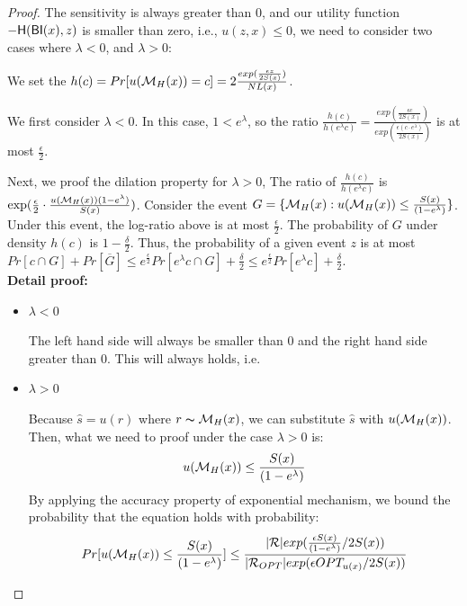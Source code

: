 \begin{proof}

The sensitivity is always greater than 0, and our utility function $-\mathsf{H}(\mathsf{BI}(x),z)$ is smaller than zero, i.e., $u(z,x) \leq 0$, we need to consider two cases where $\lambda < 0$, and $\lambda > 0$:

We set the $h(c) = Pr[u(\mathcal{M}_H(x)) = c] = 2\frac{exp(\frac{\epsilon z}{2 S(x)})}{NL(x)}$.

We first consider $\lambda < 0$. In this case, $1 < e ^ {\lambda}$, so the ratio $\frac{h(c)}{h(e^{\lambda}c)} = \frac{exp(\frac{\epsilon c}{2 S(x)})}{exp(\frac{\epsilon (c \cdot e^{\lambda})}{2 S(x)})}$ is at most $\frac{\epsilon}{2}$.

Next, we proof the dilation property for $\lambda > 0$, The ratio of $\frac{h(c)}{h(e^{\lambda}c)}$ is $\exp(\frac{\epsilon}{2} \cdot \frac{u(\mathcal{M}_H(x)) (1 - e^{\lambda})}{S(x)})$. Consider the event $G = \{ \mathcal{M}_H(x) : u(\mathcal{M}_H(x)) \leq \frac{S(x)}{(1 - e^{\lambda})}\}$. Under this event, the log-ratio above is at most $\frac{\epsilon}{2}$. The probability of $G$ under density $h(c)$ is $1 - \frac{\delta}{2}$. Thus, the probability of a given event $z$ is at most $Pr[c \cap G] + Pr[\overline{G}] \leq e^{\frac{\epsilon}{2}} Pr[e^{\lambda}c \cap G] + \frac{\delta}{2} \leq e^{\frac{\epsilon}{2}} Pr[e^{\lambda}c] + \frac{\delta}{2}$.\\


\textbf{Detail proof:}
\begin{itemize}

	\item $\lambda < 0$

		The left hand side will always be smaller than 0 and the right hand side greater than 0. This will always holds, i.e.
		\begin{equation*}
		\end{equation*}
	\item $\lambda > 0$


Because $\hat{s} = u(r)$ where $r \thicksim \mathcal{M}_H(x)$, we can substitute $\hat{s}$ with $u(\mathcal{M}_H(x))$. Then, what we need to proof under the case $\lambda > 0$ is:
\begin{equation*}
u(\mathcal{M}_H(x)) \leq \frac{S(x)}{(1 - e ^ {\lambda})}
\end{equation*}
By applying the accuracy property of exponential mechanism, we bound the probability that the equation holds with probability:
\begin{equation*}
\begin{split}
Pr[u(\mathcal{M}_H(x)) \leq \frac{S(x)}{(1 - e ^ {\lambda})}] 
& \leq \frac{|\mathcal{R}|exp(\frac{\epsilon S(x)}{(1 - e ^ {\lambda})}/2 S(x))}{|\mathcal{R}_{OPT}| exp(\epsilon OPT_{u(x)}/2 S(x))}\\
\end{split}
\end{equation*}


\end{itemize}
\end{proof}
